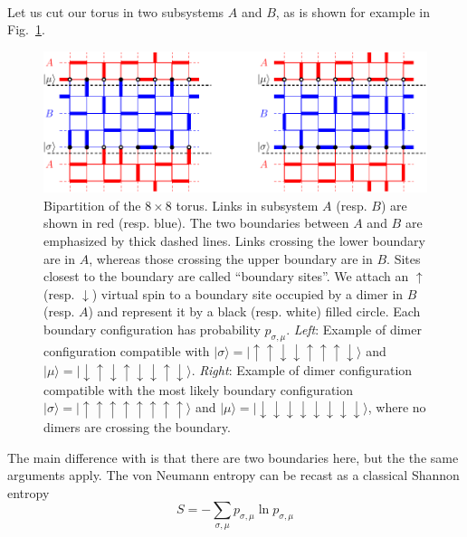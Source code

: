 \documentclass[11pt]{iopart}
\begin{document}
\paragraph{} Let us cut our torus in two subsystems $A$ and $B$, as is shown for example in Fig.~\ref{fig:bipartition}.
\begin{figure}[ht]
\begin{center}
\includegraphics{./figures/bipartition.pdf}
\end{center}
\caption{Bipartition of the $8\times 8$ torus. Links in subsystem $A$ (resp. $B$) are shown in red (resp. blue). The two boundaries between $A$ and $B$ are emphasized by thick dashed lines. Links crossing the lower boundary are in $A$, whereas those crossing the upper boundary are in $B$. Sites closest to the boundary are called ``boundary sites''. We attach an $\uparrow$ (resp. $\downarrow$) virtual spin to a boundary site occupied by a dimer in $B$ (resp. $A$) and represent it by a black (resp. white) filled circle. Each boundary configuration has probability $p_{\sigma,\mu}$. \emph{Left}: Example of dimer configuration compatible with $|\sigma\rangle=|\!\uparrow\uparrow\downarrow\downarrow\uparrow\uparrow\uparrow\downarrow\rangle$ and $|\mu\rangle=|\!\downarrow\uparrow\downarrow\uparrow\downarrow\downarrow\uparrow\downarrow\rangle$. \emph{Right}: Example of dimer configuration compatible with the most likely boundary configuration $|\sigma\rangle=|\!\uparrow\uparrow\uparrow\uparrow\uparrow\uparrow
\uparrow\uparrow\rangle$ and $|\mu\rangle=|\!\downarrow\downarrow\downarrow
\downarrow\downarrow\downarrow\downarrow\downarrow\rangle$, where no dimers are crossing the boundary.}
\label{fig:bipartition}
\end{figure}
The main difference with \cite{Misguich} is that there are two boundaries here, but the the same arguments apply. The von Neumann entropy can be recast as a classical Shannon entropy
\begin{equation}
 S=-\sum_{\sigma,\mu} p_{\sigma,\mu} \ln p_{\sigma,\mu}
\end{equation}
\end{document}
